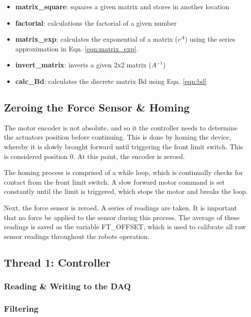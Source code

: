 \documentclass{article}
\begin{document}
	\begin{itemize}
		\item \textbf{matrix\_square}: squares a given matrix and stores in another location
		\item  \textbf{factorial}: calculations the factorial of a given number
		\item  \textbf{matrix\_exp}: calculates the exponential of a matrix ($e^A$) using the series approximation in Eqn. \ref{eqn:matrix_exp}.
		\item  \textbf{invert\_matrix}: inverts a given 2x2 matrix ($A^{-1}$)
		\item  \textbf{calc\_Bd}: calculates the discrete matrix Bd using Eqn. \ref{eqn:bd}
		
	\end{itemize}
	
	\subsection{Zeroing the Force Sensor \& Homing}
	
	The motor encoder is not absolute, and so it the controller needs to determine the actuators position before continuing. This is done by homing the device, whereby it is slowly brought forward until triggering the front limit switch. This is considered position 0. At this point, the encoder is zeroed. 
	
	The homing process is comprised of a while loop, which is continually checks for contact from the front limit switch. A slow forward motor command is set constantly until the limit is triggered, which stops the motor and breaks the loop. 
	
	Next, the force sensor is zeroed. A series of readings are taken. It is important that no force be applied to the sensor during this process. The average of these readings is saved as the variable FT\_OFFSET, which is used to calibrate all raw sensor readings throughout the robots operation.
	
	\subsection{Thread 1: Controller}
	
	\subsubsection{Reading \& Writing to the DAQ}
	\subsubsection{Filtering}
\end{document}
